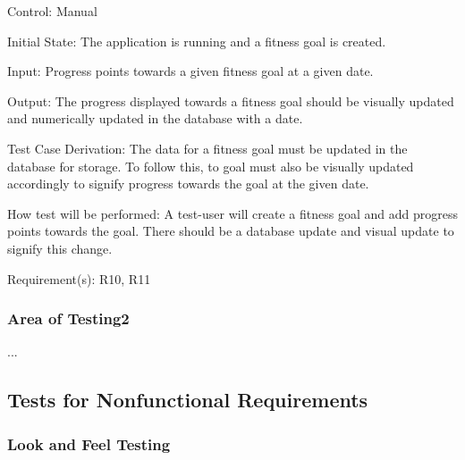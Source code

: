 \documentclass[12pt, titlepage]{article}
\begin{document}
\begin{enumerate}
		Control: Manual
		
		Initial State: The application is running and a fitness goal is created.
		
		Input: Progress points towards a given fitness goal at a given date.
		
		Output: The progress displayed towards a fitness goal should be visually updated and numerically updated in the database with a date.
		
		Test Case Derivation: The data for a fitness goal must be updated in the database for storage. To follow this, to goal must also be visually updated accordingly to signify progress towards the goal at the given date.
		
		How test will be performed: A test-user will create a fitness goal and add progress points towards the goal. There should be a database update and visual update to signify this change.
		
		Requirement(s): R10, R11
		
		
	\end{enumerate}
	
	\subsubsection{Area of Testing2}
	
	...
	
	\subsection{Tests for Nonfunctional Requirements}
	
	
	
	
	\subsubsection{Look and Feel Testing}
	
\end{document}
